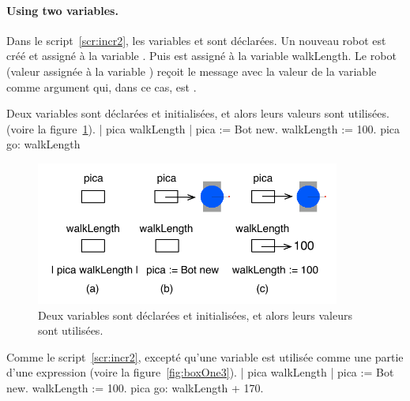 \documentclass[a4paper,10pt,twoside]{book}
\begin{document}

\paragraph{Using two variables.}

Dans le script~\ref{scr:incr2}, les variables  et  sont d\'eclar\'ees. Un nouveau robot est cr\'e\'e et  assign\'e \`a la variable . Puis  est assign\'e \`a la variable walkLength. Le robot (valeur assign\'ee \`a la variable ) re\c coit le message  avec la valeur de la variable  comme argument qui, dans ce cas, est .

\begin{script}[incr2]{Deux variables sont d\'eclar\'ees et initialis\'ees, et alors leurs valeurs sont utilis\'ees. (voire la figure~\ref{fig:boxOne2}).}
	| pica walkLength | 
	pica := Bot new. 
	walkLength := 100. 
	pica go: walkLength
\end{script}

\begin{figure}[h]
	\centerline{\includegraphics[width=10cm]{boxOne2}}
	\caption{Deux variables sont d\'eclar\'ees et initialis\'ees, et alors leurs valeurs sont utilis\'ees.  
	\label{fig:boxOne2}}
\end{figure}



\begin{script}[incr3]{Comme le script~\ref{scr:incr2}, except\'e qu'une variable est utilis\'ee comme une partie d'une expression  (voire la figure~\ref{fig:boxOne3}).}
	| pica walkLength | 
	pica := Bot new. 
	walkLength := 100. 
	pica go: walkLength + 170. 
\end{script}
\end{document}
